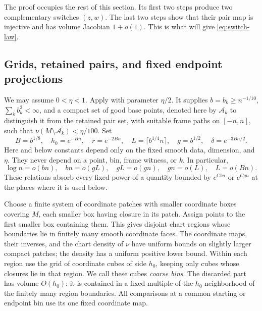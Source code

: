 The proof occupies the rest of this section.  Its first two steps produce
two complementary switches $(z,w)$.  The last two steps show that their
pair map is injective and has volume Jacobian $1+o(1)$.  This is what
will give \eqref{eq:switch-law}.

\subsection{Grids, retained pairs, and fixed endpoint projections}

We may assume $0<\eta<1$.  Apply  with parameter
$\eta/2$.  It supplies $b=b_k\ge n^{-1/10}$,
$\sum_k b_k^2<\infty$, and a compact set of good base points,
denoted here by $\mathcal A_k$ to distinguish it from the retained pair set,
with suitable frame paths on $[-n,n]$, such that
$\nu(M\setminus\mathcal A_k)<\eta/100$.  Set
\begin{equation}\label{eq:switch-scales}
 B=b^{1/8},\quad h_0=e^{-Bn},\quad r=e^{-2Bn},\quad
 L=\lceil b^{1/4}n\rceil,\quad g=b^{1/2},\quad
 \delta=e^{-3Bn/2}.
\end{equation}
Here and below constants depend only on the fixed smooth data, dimension,
and $\eta$.  They never depend on a point, bin, frame witness, or $k$.
In particular,
\begin{equation}\label{eq:switch-scale-order}
 \log n=o(bn),\quad bn=o(gL),\quad gL=o(gn),\quad
 gn=o(L),\quad L=o(Bn).
\end{equation}
These relations absorb every fixed power of a quantity bounded by
$e^{Cbn}$ or $e^{Cgn}$ at the places where it is used below.

Choose a finite system of coordinate patches with smaller coordinate
boxes covering $M$, each smaller box having closure in its patch.
Assign points to the first smaller box containing them.  This gives
disjoint chart regions whose boundaries lie in finitely many smooth
coordinate faces.  The coordinate maps, their inverses, and the chart
density of $\nu$ have uniform bounds on slightly larger compact patches;
the density has a uniform positive lower bound.  Within each region
use the grid of coordinate cubes of side $h_0$, keeping only cubes whose
closures lie in that region.  We call these cubes \emph{coarse bins}.
The discarded part has volume $O(h_0)$: it is contained in a fixed
multiple of the $h_0$-neighborhood of the finitely many region boundaries.
All comparisons at a common starting or endpoint bin use its one fixed
coordinate map.

